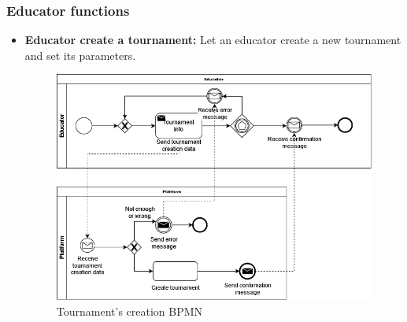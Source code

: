 \documentclass{article}
\begin{document}
{    \subsubsection{Educator functions}
        \begin{itemize}
            \item \textbf{Educator create a tournament:} Let an educator create a new tournament and set its parameters.
            \begin{figure}[H]
                \centering
                \includegraphics[scale=0.4]{images/BPMN/BPMN8.png}
                \caption{Tournament's creation BPMN}
                \label{fig:TournamentCreationBPMN}
            \end{figure}


\end{itemize}}
\end{document}
